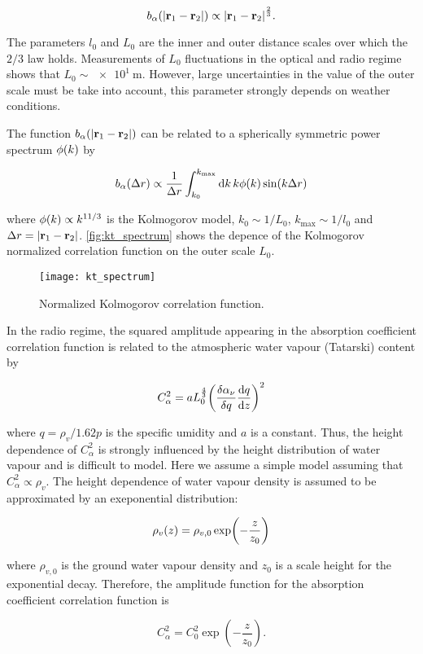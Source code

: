 \begin{equation}
        b_\alpha\qty(\abs{\vb{r}_1 - \vb{r}_2}) \propto
        \abs{\vb{r}_1 - \vb{r}_2}^\frac{2}{3}.
\end{equation}

The parameters $l_0$ and $L_0$ are the inner and outer distance scales over
which the $2/3$ law holds. Measurements of $L_0$ fluctuations in the
optical and radio regime shows that $L_0 \sim \SI{e1}{\meter}$. However, large
uncertainties in the value of the outer scale must be take into account,
this parameter strongly depends on weather conditions.

The function $b_\alpha\qty(\abs{\vb{r}_1 - \vb{r}_2})$ can be related to a
spherically symmetric power spectrum $\phi\qty(k)$ by

\begin{equation}
        b_\alpha\qty(\Delta r) \propto \frac{1}{\Delta r}
        \int^{k_\text{max}}_{k_0} \dd{k} k \phi\qty(k) \sin(k\Delta r)
\end{equation}

where $\phi\qty(k) \propto k^{11/3}$ is the Kolmogorov model, $k_0 \sim
1/L_0$, $k_\text{max} \sim 1/l_0$ and $\Delta r = \abs{\vb{r}_1 -
\vb{r}_2}$. \autoref{fig:kt_spectrum} shows the depence of the Kolmogorov
normalized correlation function on the outer scale $L_0$.

\begin{figure}
        \centering
        \texttt{[image: kt\_spectrum]}
        \caption{Normalized Kolmogorov correlation function.}
        \label{fig:kt_spectrum}
\end{figure}

In the radio regime, the squared amplitude appearing in the absorption
coefficient correlation function is related to the atmospheric water vapour
(Tatarski) content by

\begin{equation}
        C^2_\alpha = a L^\frac{4}{3}_0 \qty(\fdv{\alpha_\nu}{q}
        \dv{q}{z})^2
\end{equation}

where $q = \rho_v/1.62p$ is the specific umidity and $a$ is a constant.
Thus, the height dependence of $C^2_\alpha$ is strongly influenced by the
height distribution of water vapour and is difficult to model. Here we
assume a simple model assuming that $C^2_\alpha \propto \rho_v$. The height
dependence of water vapour density is assumed to be approximated by an
exeponential distribution:

\begin{equation}
        \rho_v\qty(z) = \rho_{v,0} \exp(-\frac{z}{z_0})
\end{equation}

where $\rho_{v,0}$ is the ground water vapour density and $z_0$ is a scale
height for the exponential decay. Therefore, the amplitude function for the
absorption coefficient correlation function is

\begin{equation}
        C^2_\alpha = C^2_0\exp(-\frac{z}{z_0}).
\end{equation}

